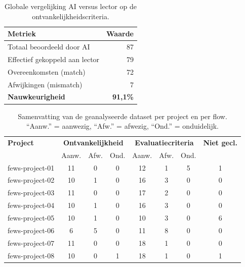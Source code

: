 \documentclass[dutch,dit,thesis]{hogentreport}
\begin{document}
\listoftables

\clearpage

\begin{table}[htbp]
    \centering
    \caption[Globale ontvankelijkheidsresultaten]{Globale vergelijking AI versus lector op de ontvankelijkheidscriteria.}
    \label{tab:ontv-globaal}
    \begin{tabular}{l r}
        \hline
        \textbf{Metriek} & \textbf{Waarde} \\
        \hline
        Totaal beoordeeld door AI & 87 \\
        Effectief gekoppeld aan lector & 79 \\
        Overeenkomsten (match) & 72 \\
        Afwijkingen (mismatch) & 7 \\
        \textbf{Nauwkeurigheid} & \textbf{91,1\%} \\
        \hline
    \end{tabular}
\end{table}

\begin{table}[htbp]
    \centering
    \caption[Overzicht geëvalueerde projecten]{Samenvatting van de geanalyseerde dataset per project en per flow. ``Aanw.'' = aanwezig, ``Afw.'' = afwezig, ``Ond.'' = onduidelijk.}
    \label{tab:dataset-overzicht}
    \small
    \begin{tabular}{l c c c c c c c}
        \hline
        \textbf{Project} & \multicolumn{3}{c}{\textbf{Ontvankelijkheid}} & \multicolumn{3}{c}{\textbf{Evaluatiecriteria}} & \textbf{Niet gecl.} \\
        & Aanw. & Afw. & Ond. & Aanw. & Afw. & Ond. & \\
        \hline
        fews-project-01 & 11 & 0 & 0 & 12 & 1 & 5 & 1 \\
        fews-project-02 & 10 & 1 & 0 & 16 & 3 & 0 & 0 \\
        fews-project-03 & 11 & 0 & 0 & 17 & 2 & 0 & 0 \\
        fews-project-04 & 10 & 1 & 0 & 16 & 3 & 0 & 0 \\
        fews-project-05 & 10 & 1 & 0 & 10 & 3 & 0 & 6 \\
        fews-project-06 & 6  & 5 & 0 & 11 & 8 & 0 & 0 \\
        fews-project-07 & 11 & 0 & 0 & 18 & 1 & 0 & 0 \\
        fews-project-08 & 10 & 0 & 1 & 18 & 1 & 0 & 1 \\
        \hline
    \end{tabular}
\end{table}
\end{document}
